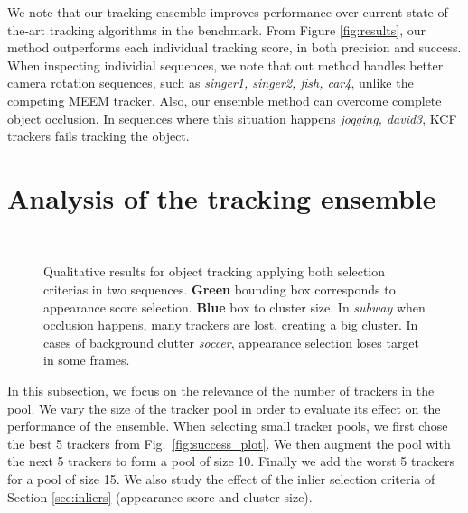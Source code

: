We note that our tracking ensemble improves performance over current
state-of-the-art tracking algorithms in the benchmark.
From Figure \ref{fig:results}, our method outperforms each individual tracking
score, in both precision and success.
When inspecting individial sequences, we note that 
out method handles better camera
rotation sequences, such as \textit{singer1, singer2, fish, car4}, unlike
the competing
MEEM tracker. Also, our ensemble method can overcome complete object occlusion. In
sequences where this situation happens \textit{jogging, david3}, KCF trackers
fails tracking the object. 



\section{Analysis of the tracking ensemble}
\begin{figure}[b!]
\centering
	 \\
	\hspace{0.05cm}
\vspace{-2mm}
\caption{\small Qualitative results for object tracking applying both selection
	criterias in two sequences. \textbf{Green} bounding box corresponds to
	appearance score selection. \textbf{Blue} box to cluster size. In
	\textit{subway} when occlusion happens, many trackers are lost, creating a
	big cluster. In cases of background clutter \textit{soccer}, appearance
	selection loses target in some frames.}
\label{fig::clustvsapp}
\end{figure}


In this subsection, we focus on the relevance of the number of trackers in the pool.
We vary the size of the tracker pool in order to evaluate its effect on the
performance of the ensemble.
When selecting small tracker pools, we first chose the best 5 trackers
from Fig.~\ref{fig:success_plot}. We then augment the pool with the next 5 trackers to
form a pool of size 10. Finally we add the worst 5 trackers for a pool of size 15.
We also study the effect of the inlier selection criteria of Section
\ref{sec:inliers}
(appearance score and cluster size).

